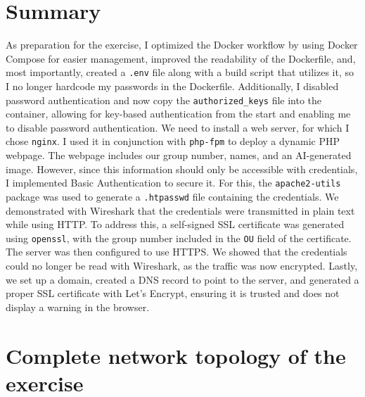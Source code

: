 \documentclass[a4paper]{article}
\newcommand{\abc}{\hfill \break}
\begin{document}
\section{Summary}
As preparation for the exercise, I optimized the Docker workflow by using Docker Compose for easier management, improved the readability of the Dockerfile, and, most importantly, created a \texttt{.env} file along with a build script that utilizes it, so I no longer hardcode my passwords in the Dockerfile. Additionally, I disabled password authentication and now copy the \texttt{authorized\_keys} file into the container, allowing for key-based authentication from the start and enabling me to disable password authentication.\abc
We need to install a web server, for which I chose \texttt{nginx}. I used it in conjunction with \texttt{php-fpm} to deploy a dynamic PHP webpage. The webpage includes our group number, names, and an AI-generated image. However, since this information should only be accessible with credentials, I implemented Basic Authentication to secure it. For this, the \texttt{apache2-utils} package was used to generate a \texttt{.htpasswd} file containing the credentials.\abc
We demonstrated with Wireshark that the credentials were transmitted in plain text while using HTTP. To address this, a self-signed SSL certificate was generated using \texttt{openssl}, with the group number included in the \texttt{OU} field of the certificate. The server was then configured to use HTTPS. We showed that the credentials could no longer be read with Wireshark, as the traffic was now encrypted.\abc
Lastly, we set up a domain, created a DNS record to point to the server, and generated a proper SSL certificate with Let's Encrypt, ensuring it is trusted and does not display a warning in the browser.

\newpage

\section{Complete network topology of the exercise}
\end{document}
